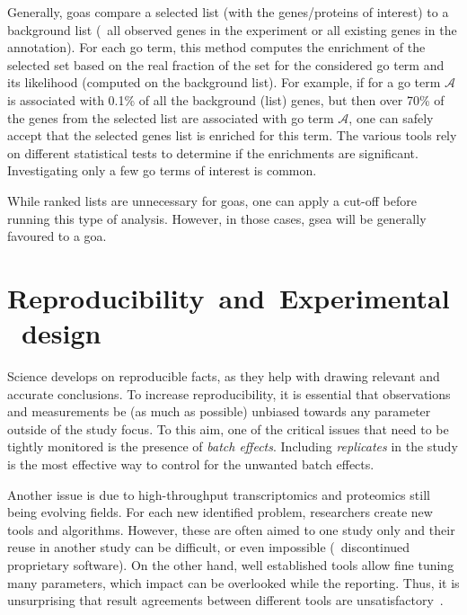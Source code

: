 Generally, \glspl{goa} compare a selected list (with the genes/proteins of interest)
to a background list
(\eg\ all observed genes in the experiment or all existing genes in the annotation).
For each \gls{go} term,
this method computes the enrichment of the selected set based on
the real fraction of the set for the considered \gls{go} term and its likelihood
(computed on the background list).
For example, if for a \gls{go} term $\mathcal{A}$ is associated with 0.1\%
of all the background (list) genes,
but then over 70\% of the genes from the selected list are associated
with \gls{go} term $\mathcal{A}$,
one can safely accept that the selected genes list is enriched for this term.
The various tools rely on different statistical tests to determine
if the enrichments are significant.
Investigating only a few \gls{go} terms of interest is common.

While ranked lists are unnecessary for \glspl{goa},
one can apply a cut-off before running this type of analysis.
However, in those cases,
\gls{gsea} will be generally favoured to a \gls{goa}.

\section{Reproducibility~and~Experimental~design}\label{sec:expDesign}

Science develops on reproducible facts,
as they help with drawing relevant and accurate conclusions.
To increase reproducibility,
it is essential that observations and measurements
be (as much as possible) unbiased
towards any parameter outside of the study focus.
To this aim, one of the critical issues that need to be tightly monitored
is the presence of \emph{batch effects}.
Including \emph{replicates} in the study is the most effective way to control
for the unwanted batch effects.\\
\vspace{-\baselineskip}

Another issue is due to high-throughput transcriptomics and proteomics
still being evolving fields.
For each new identified problem,
researchers create new tools and algorithms.
However, these are often aimed to one study only
and their reuse in another study can be difficult,
or even impossible (\eg\ discontinued proprietary software).
On the other hand, well established tools allow fine tuning many parameters,
which impact can be overlooked while the reporting.
Thus, it is unsurprising that result agreements between different tools
are unsatisfactory~.


